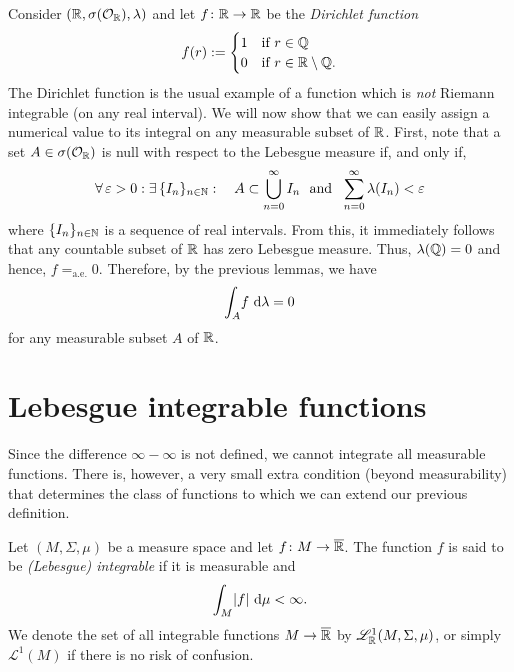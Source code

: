 \begin{example}
Consider $(\mathbb{R},\sigma(\mathcal{O}_{\mathbb{R}}),\lambda)$ and let $f\colon \mathbb{R} \to \mathbb{R}$ be the \emph{Dirichlet function}
\begin{equation*}
f(r) := \begin{cases}
1 & \text{if } r\in \mathbb{Q}\\
0 & \text{if } r\in \mathbb{R}\setminus \mathbb{Q}.
\end{cases}
\end{equation*}
The Dirichlet function is the usual example of a function which is \emph{not} Riemann integrable (on any real interval). We will now show that we can easily assign a numerical value to its integral on any measurable subset of $\mathbb{R}$. First, note that a set $A\in\sigma(\mathcal{O}_{\mathbb{R}})$ is null with respect to the Lebesgue measure if, and only if, 
\begin{equation*}
\forall \, \varepsilon >0 : \exists \, \{I_n\}_{n\in\mathbb{N}} : \quad A\subset \bigcup_{n=0}^{\infty}I_n \ \text{ and } \ \sum_{n=0}^{\infty}\lambda(I_n)<\varepsilon
\end{equation*}
where $\{I_n\}_{n\in\mathbb{N}}$ is a sequence of real intervals. From this, it immediately follows that any countable subset of $\mathbb{R}$ has zero Lebesgue measure. Thus, $\lambda(\mathbb{Q})=0$ and hence, $f=_{\mathrm{a.e.}}0$. Therefore, by the previous lemmas, we have
\begin{equation*}
\int_A\! f \, \mathop{}\!\mathrm{d} \lambda = 0
\end{equation*}
for any measurable subset $A$ of $\mathbb{R}$. 
\end{example}

\section{Lebesgue integrable functions}

Since the difference $\infty-\infty$ is not defined, we cannot integrate all measurable functions. There is, however, a very small extra condition (beyond measurability) that determines the class of functions to which we can extend our previous definition.

\begin{definition}
Let $(M,\Sigma,\mu)$ be a measure space and let $f\colon M\to\overline{\mathbb{R}}$. The function $f$ is said to be \emph{(Lebesgue) integrable} if it is measurable and
\begin{equation*}
\int_{M}\!|f|\,\mathop{}\!\mathrm{d} \mu < \infty.
\end{equation*}
We denote the set of all integrable functions $M\to\overline{\mathbb{R}}$ by $\mathscr{L}^1_{\mathbb{R}}(M,\Sigma,\mu)$, or simply $\mathscr{L}^1(M)$ if there is no risk of confusion.
\end{definition}

